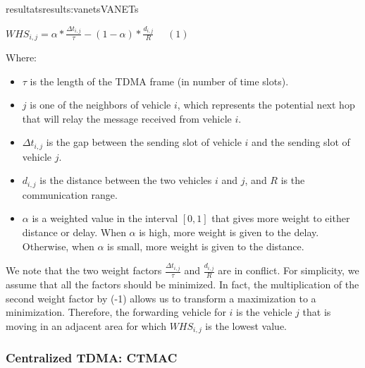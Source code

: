 \documentclass{ra2016}
\begin{document}
\begin{module}{resultats}{results:vanets}{VANETs}
\begin{center}
\vspace{2mm}
$WHS_{i,j}=\alpha*\frac{\Delta t_{i,j}}{\tau}-(1-\alpha)*\frac{d_{i,j}}{R}~~~~~~(1)$ 
\vspace{2mm}
\end{center}
Where:
\begin{itemize}
\item $\tau$ is the length of the TDMA frame (in number of time slots).
\item $j$ is one of the neighbors of vehicle $i$, which represents the potential next hop that will relay the message 
received from vehicle $i$.
\item $\Delta t_{i,j}$ is the gap between the sending slot of vehicle $i$ and the sending slot of vehicle $j$.
\item $d_{i,j}$ is the distance between the two vehicles $i$ and $j$, and $R$ is the communication range. 
\item $\alpha$ is a weighted value in the interval $[0,1]$ that gives more weight to either distance or delay. When $\alpha$ is 
high, more weight is given to the delay. Otherwise, when $\alpha$ is small, more weight is given to the distance.
\end{itemize}
We note that the two weight factors $\frac{\Delta t_{i,j}}{\tau}$ and $\frac{d_{i,j}}{R}$ are in conflict. For simplicity, we assume 
that all the factors should be minimized. In fact, the multiplication of the second weight factor
by (-1) allows us to transform a maximization to a minimization. Therefore, the forwarding vehicle for $i$ is the 
vehicle $j$ that is moving in an adjacent area for which $WHS_{i,j}$ is the lowest value.



\subsubsection{Centralized TDMA: CTMAC}


\end{module}
\end{document}
